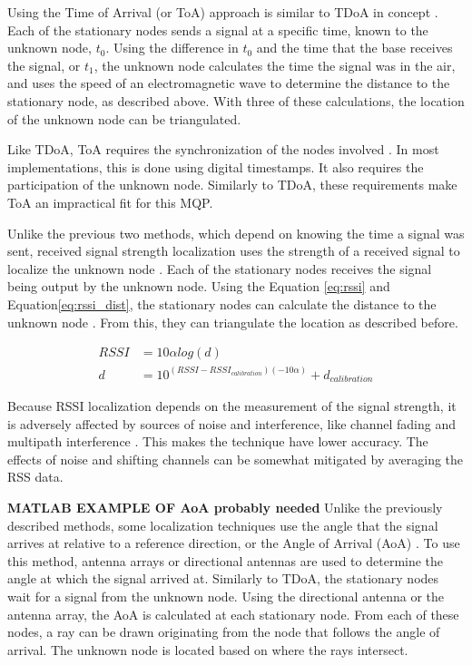 Using the Time of Arrival (or ToA) approach is similar to TDoA in concept \cite{local_conf}. Each of the stationary nodes sends a signal at a specific time, known to the unknown node, $t_0$. Using the difference in $t_0$ and the time that the base receives the signal, or $t_1$, the unknown node calculates the time the signal was in the air, and uses the speed of an electromagnetic wave to determine the distance to the stationary node, as described above. With three of these calculations, the location of the unknown node can be triangulated.\par

Like TDoA, ToA requires the synchronization of the nodes involved \cite{local_conf}. In most implementations, this is done using digital timestamps. It also requires the participation of the unknown node. Similarly to TDoA, these requirements make ToA an impractical fit for this MQP. \par

Unlike the previous two methods, which depend on knowing the time a signal was sent, received signal strength localization uses the strength of a received signal to localize the unknown node \cite{local_conf}. Each of the stationary nodes receives the signal being output by the unknown node. Using the Equation \ref{eq:rssi} and Equation\ref{eq:rssi_dist}, the stationary nodes can calculate the distance to the unknown node \cite{rss_calc}. From this, they can triangulate the location as described before.\par
\begin{align}
\label{eq:rssi} RSSI &= 10\alpha log(d) \\ 
\label{eq:rssi_dist} d &= 10^{(RSSI-RSSI_{calibration})(-10\alpha)} + d_{calibration}
\end{align}
\par
Because RSSI localization depends on the measurement of the signal strength, it is adversely affected by sources of noise and interference, like channel fading and multipath interference \cite{local_conf}. This makes the technique have lower accuracy. The effects of noise and shifting channels can be somewhat mitigated by averaging the RSS data.

\textbf{MATLAB EXAMPLE OF AoA probably needed}
Unlike the previously described methods, some localization techniques use the angle that the signal arrives at relative to a reference direction, or the Angle of Arrival (AoA) \cite{local_aoa}. To use this method, antenna arrays or directional antennas are used to determine the angle at which the signal arrived at. Similarly to TDoA, the stationary nodes wait for a signal from the unknown node. Using the directional antenna or the antenna array, the AoA is calculated at each stationary node. From each of these nodes, a ray can be drawn originating from the node that follows the angle of arrival. The unknown node is located based on where the rays intersect.

